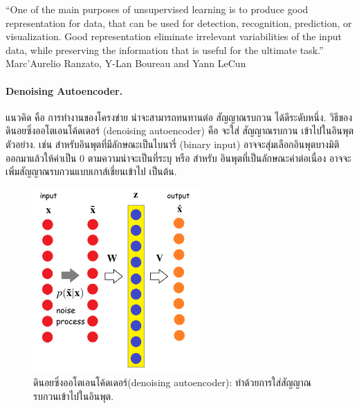 ``One of the main purposes of unsupervised learning is to produce good representation for data, that can be used for detection, recognition, prediction, or visualization. 
Good representation eliminate irrelevant variabilities of the input data, 
while preserving the information that is useful for the ultimate task.''
Marc'Aurelio Ranzato, Y-Lan Boureau and Yann LeCun\cite{RanzatoEtAl2007b}

\paragraph{Denoising Autoencoder.}  
แนวคิด คือ การทำงานของโครงข่าย น่าจะสามารถทนทานต่อ สัญญาณรบกวน ได้ดีระดับหนึ่ง.
วิธีของ ดินอยซิ่งออโตเอนโค้ดเดอร์ (denoising autoencoder) คือ จะใส่ สัญญาณรบกวน เข้าไปในอินพุตตัวอย่าง.
เช่น สำหรับอินพุตที่มีลักษณะเป็นไบนารี่ (binary input) อาจจะสุ่มเลือกอินพุตบางมิติออกมาแล้วให้ค่าเป็น $0$ ตามความน่าจะเป็นที่ระบุ
หรือ สำหรับ อินพุตที่เป็นลักษณะค่าต่อเนื่อง อาจจะเพิ่มสัญญาณรบกวนแบบเกาส์เชี่ยนเข้าไป เป็นต้น.


%
\begin{figure}
\begin{center}
\includegraphics[width=2.5in]{04ANNDeep/denoisingAutoencoder.png}
\end{center}
\caption{ดินอยซิ่งออโตเอนโค้ดเดอร์(denoising autoencoder): ทำด้วยการใส่สัญญาณรบกวนเข้าไปในอินพุต.}
\label{fig: deep denoising autoencoder}
\end{figure}
%

